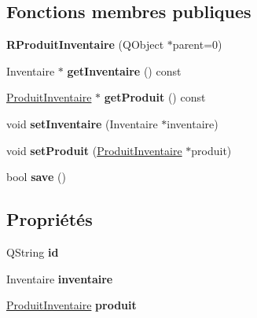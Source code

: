 \subsection*{Fonctions membres publiques}
\begin{DoxyCompactItemize}
\item 
\hypertarget{class_r_produit_inventaire_a7edd21af5158dd125d0ae7ff91bfc391}{
{\bfseries RProduitInventaire} (QObject $\ast$parent=0)}
\label{d8/dde/class_r_produit_inventaire_a7edd21af5158dd125d0ae7ff91bfc391}

\item 
\hypertarget{class_r_produit_inventaire_ab65a7c14d395b850cd735cce3dcfb03a}{
Inventaire $\ast$ {\bfseries getInventaire} () const }
\label{d8/dde/class_r_produit_inventaire_ab65a7c14d395b850cd735cce3dcfb03a}

\item 
\hypertarget{class_r_produit_inventaire_aed628da2298761c05331f800b2bbc09b}{
\hyperlink{class_produit_inventaire}{ProduitInventaire} $\ast$ {\bfseries getProduit} () const }
\label{d8/dde/class_r_produit_inventaire_aed628da2298761c05331f800b2bbc09b}

\item 
\hypertarget{class_r_produit_inventaire_a545659f533dbd93b5349a62e88df1c49}{
void {\bfseries setInventaire} (Inventaire $\ast$inventaire)}
\label{d8/dde/class_r_produit_inventaire_a545659f533dbd93b5349a62e88df1c49}

\item 
\hypertarget{class_r_produit_inventaire_a12d8a7cfbc78a77f5666959a4d90427e}{
void {\bfseries setProduit} (\hyperlink{class_produit_inventaire}{ProduitInventaire} $\ast$produit)}
\label{d8/dde/class_r_produit_inventaire_a12d8a7cfbc78a77f5666959a4d90427e}

\item 
\hypertarget{class_r_produit_inventaire_aceb76d4c17705a748b92a3c409277c1d}{
bool {\bfseries save} ()}
\label{d8/dde/class_r_produit_inventaire_aceb76d4c17705a748b92a3c409277c1d}

\end{DoxyCompactItemize}
\subsection*{Propriétés}
\begin{DoxyCompactItemize}
\item 
\hypertarget{class_r_produit_inventaire_a01ec1f3d8ff649321ba36857b4a22c7d}{
QString {\bfseries id}}
\label{d8/dde/class_r_produit_inventaire_a01ec1f3d8ff649321ba36857b4a22c7d}

\item 
\hypertarget{class_r_produit_inventaire_a195711935b3a646f93016e85d73afab5}{
Inventaire {\bfseries inventaire}}
\label{d8/dde/class_r_produit_inventaire_a195711935b3a646f93016e85d73afab5}

\item 
\hypertarget{class_r_produit_inventaire_a7bf6f6a1067b5ccfe3b04415229cdfd1}{
\hyperlink{class_produit_inventaire}{ProduitInventaire} {\bfseries produit}}
\label{d8/dde/class_r_produit_inventaire_a7bf6f6a1067b5ccfe3b04415229cdfd1}

\end{DoxyCompactItemize}


